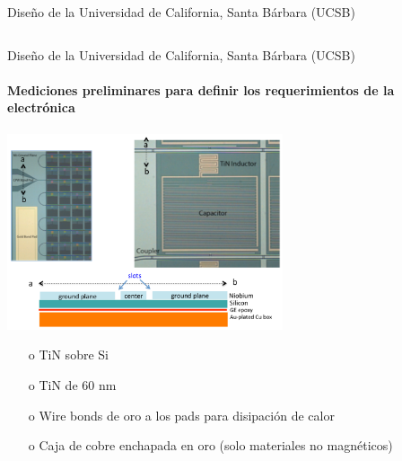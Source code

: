 \documentclass[ignorenonframetext,12pt]{beamer}
\begin{document}
\begin{frame}{Diseño de la Universidad de California, Santa Bárbara (UCSB)}
\begin{columns}
\begin{column}{0.49\textwidth}
		\end{column}
	\end{columns}
	\end{frame}
	\begin{frame}{Diseño de la Universidad de California, Santa Bárbara (UCSB)}
		\framesubtitle{Mediciones preliminares para definir los requerimientos
		de la electrónica}
		\centering
		\includegraphics[width=0.61\textwidth]{mkid_ucsb2}
		\footnotesize{\begin{itemize}
			\item[o] TiN sobre Si
			\item[o] TiN de 60 nm
			\item[o] Wire bonds de oro a los pads para
				disipación de calor
			\item[o] Caja de cobre enchapada en oro (solo
				materiales no magnéticos)

		\end{itemize}}
		\end{frame}
\end{document}
